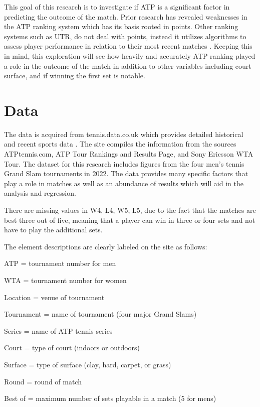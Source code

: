 \documentclass[12pt]{article}
\begin{document}
This goal of this research is to investigate if ATP is a significant factor
in predicting the outcome of the match. Prior research has revealed weaknesses 
in the ATP ranking system which has its basis rooted in points. Other ranking 
systems such as UTR, do not deal with points, instead it utilizes algorithms to 
assess player performance in relation to their most recent matches \citet{Bodo2022Rankings}. 
Keeping this in mind, this exploration will see how heavily and accurately ATP 
ranking played a role in the outcome of the match in addition to other variables 
including court surface, and if winning the first set is notable.



\section{Data}
\label{sec:data}

The data is acquired from tennis.data.co.uk which provides detailed historical 
and recent sports data \citep{TennisBetting}. The site compiles the information 
from the sources ATPtennis.com, ATP Tour Rankings and Results Page, and Sony 
Ericsson WTA Tour. The dataset for this research includes figures from the four 
men's tennis Grand Slam tournaments in 2022. The data provides many specific 
factors that play a role in matches as well as an abundance of results which will 
aid in the analysis and regression.

There are missing values in W4, L4, W5, L5, due to the fact that the matches are 
best three out of five, meaning that a player can win in three or four sets and 
not have to play the additional sets. 

The element descriptions are clearly labeled on the site as follows: 

ATP = tournament number for men

WTA = tournament number for women

Location = venue of tournament

Tournament =  name of tournament (four major Grand Slams)

Series = name of ATP tennis series

Court = type of court (indoors or outdoors)

Surface = type of surface (clay, hard, carpet, or grass)

Round = round of match

Best of = maximum number of sets playable in a match (5 for mens) 
\end{document}
